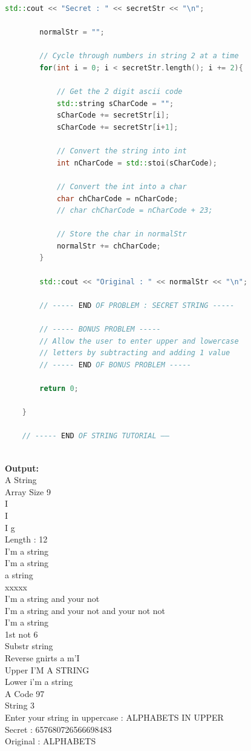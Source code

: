 \documentclass[12pt , a4paper]{article}
\begin{document}
\begin{lstlisting}[language=C++]
	    std::cout << "Secret : " << secretStr << "\n";
	    
	    normalStr = "";
	    
	    // Cycle through numbers in string 2 at a time
	    for(int i = 0; i < secretStr.length(); i += 2){
	        
	        // Get the 2 digit ascii code
	        std::string sCharCode = "";
	        sCharCode += secretStr[i];
	        sCharCode += secretStr[i+1];
	        
	        // Convert the string into int
	        int nCharCode = std::stoi(sCharCode);
	        
	        // Convert the int into a char
	        char chCharCode = nCharCode;
	        // char chCharCode = nCharCode + 23;
	        
	        // Store the char in normalStr
	        normalStr += chCharCode;
	    }
	    
	    std::cout << "Original : " << normalStr << "\n";
	    
	    // ----- END OF PROBLEM : SECRET STRING -----
	    
	    // ----- BONUS PROBLEM -----
	    // Allow the user to enter upper and lowercase
	    // letters by subtracting and adding 1 value
	    // ----- END OF BONUS PROBLEM -----
	    
	    return 0;
	    
	}
	
	// ----- END OF STRING TUTORIAL ——
	

	\end{lstlisting}

	\begin{tcolorbox}
	\textbf{Output:}\\
	A String    \\
	Array Size 9\\
	I\\
	I\\
	I g\\
	Length : 12\\ 
	I'm a string\\
	I'm a string\\
	a string\\
	xxxxx\\
	I'm a string and your not\\
	I'm a string and your not and your not not\\
	I'm a string\\
	
	
	
	1st not 6\\
	Substr string\\
	Reverse  gnirts a m'I\\
	Upper I'M A STRING\\
	Lower i'm a string\\
	A Code 97\\
	String 3\\
	Enter your string in uppercase : ALPHABETS IN UPPER\\
	Secret : 657680726566698483\\
	Original : ALPHABETS\\
	\end{tcolorbox}
\end{document}
